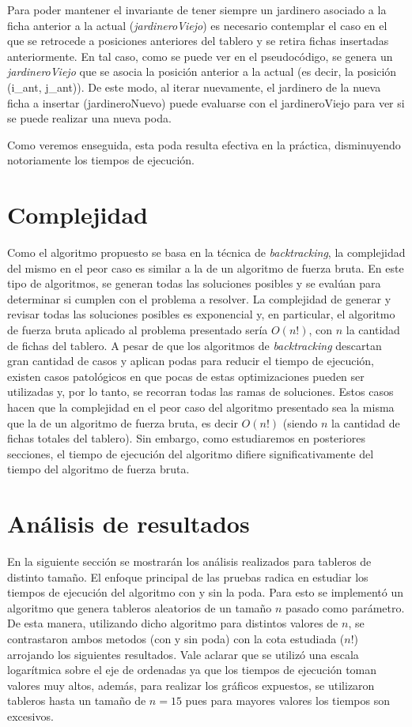 \documentclass[a4paper,11pt] {article}
\begin{document}
Para poder mantener el invariante de tener siempre un jardinero asociado a la ficha anterior a la actual (\textit{jardineroViejo}) es necesario contemplar el caso en el que se retrocede a posiciones anteriores del tablero y se retira fichas insertadas anteriormente. En tal caso, como se puede ver en el pseudoc\'odigo, se genera un \textit{jardineroViejo} que se asocia la posici\'on anterior a la actual (es decir, la posici\'on (i\_ant, j\_ant)). De este modo, al iterar nuevamente, el jardinero de la nueva ficha a insertar (jardineroNuevo) puede evaluarse con el jardineroViejo para ver si se puede realizar una nueva poda.

Como veremos enseguida, esta poda resulta efectiva en la pr\'actica, disminuyendo notoriamente los tiempos de ejecuci\'on.

\section*{Complejidad}

Como el algoritmo propuesto se basa en la t\'ecnica de \textit{backtracking}, la complejidad del mismo en el peor caso es similar a la de un algoritmo de fuerza bruta. En este tipo de algoritmos, se generan todas las soluciones posibles y se eval\'uan para determinar si cumplen con el problema a resolver. La complejidad de generar y revisar todas las soluciones posibles es exponencial y, en particular, el algoritmo de fuerza bruta aplicado al problema presentado ser\'ia $O(n!)$, con $n$ la cantidad de fichas del tablero. A pesar de que los algoritmos de \textit{backtracking} descartan gran cantidad de casos y aplican podas para reducir el tiempo de ejecuci\'on, existen casos patol\'ogicos en que pocas de estas optimizaciones pueden ser utilizadas y, por lo tanto, se recorran todas las ramas de soluciones. Estos casos hacen que la complejidad en el peor caso del algoritmo presentado sea la misma que la de un algoritmo de fuerza bruta, es decir $O(n!)$ (siendo $n$ la cantidad de fichas totales del tablero). Sin embargo, como estudiaremos en posteriores secciones, el tiempo de ejecuci\'on del algoritmo difiere significativamente del tiempo del algoritmo de fuerza bruta.

\section*{An\'alisis de resultados}

En la siguiente secci\'on se mostrar\'an los an\'alisis realizados para tableros de distinto tama\~{n}o. El enfoque principal de las pruebas radica en estudiar los tiempos de ejecuci\'on del algoritmo con y sin la poda. Para esto se implement\'o un algoritmo que genera tableros aleatorios de un tama\~{n}o $n$ pasado como par\'ametro. De esta manera, utilizando dicho algoritmo para distintos valores de $n$, se contrastaron ambos metodos (con y sin poda) con la cota estudiada ($n!$) arrojando los siguientes resultados. Vale aclarar que se utiliz\'o una escala logar\'itmica sobre el eje de ordenadas ya que los tiempos de ejecuci\'on toman valores muy altos, adem\'as, para realizar los gr\'aficos expuestos, se utilizaron tableros hasta un tama\~{n}o de $n=15$ pues para mayores valores los tiempos son excesivos.
\end{document}
